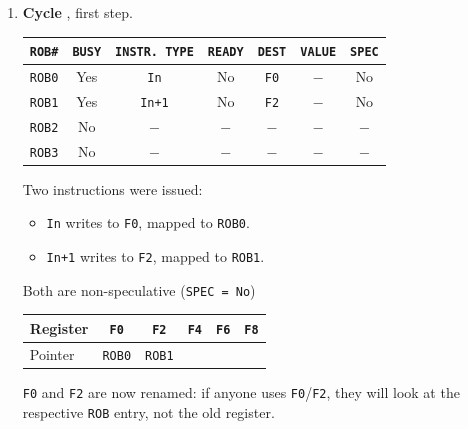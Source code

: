 \begin{examplebox}
    \begin{enumerate}
        \item \textbf{Cycle \theenumi}, first step.
        \begin{center}
            \begin{tabular}{@{} c | c | c | c | c | c | c @{}}
                \toprule
                \texttt{ROB\#} & \texttt{BUSY} & \texttt{INSTR. TYPE} & \texttt{READY} & \texttt{DEST} & \texttt{VALUE} & \texttt{SPEC} \\
                \midrule
                \texttt{ROB0} & Yes     & \texttt{In}       & No    & \texttt{F0}   & $-$     & No   \\ [.3em]
                \texttt{ROB1} & Yes     & \texttt{In+1}     & No    & \texttt{F2}   & $-$     & No   \\ [.3em]
                \texttt{ROB2} & No      & $-$               & $-$   & $-$           & $-$     & $-$   \\ [.3em]
                \texttt{ROB3} & No      & $-$               & $-$   & $-$           & $-$     & $-$   \\
                \bottomrule
            \end{tabular}
        \end{center}
        Two instructions were issued:
        \begin{itemize}
            \item \texttt{In} writes to \texttt{F0}, mapped to \texttt{ROB0}.
            \item \texttt{In+1} writes to \texttt{F2}, mapped to \texttt{ROB1}.
        \end{itemize}
        Both are non-speculative (\texttt{SPEC = No})
        \begin{center}
            \begin{tabular}{@{} l | c c c c c @{}}
                \toprule
                Register    & \texttt{F0}   & \texttt{F2}   & \texttt{F4}   & \texttt{F6}   & \texttt{F8} \\
                \midrule
                Pointer     & \texttt{ROB0} & \texttt{ROB1} &               &               &             \\
                \bottomrule
            \end{tabular}
        \end{center}
        \texttt{F0} and \texttt{F2} are now renamed: if anyone uses \texttt{F0}/\texttt{F2}, they will look at the respective \texttt{ROB} entry, not the old register.



\end{enumerate}
\end{examplebox}
